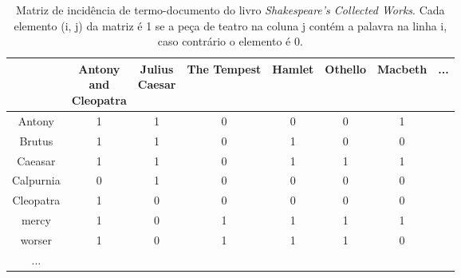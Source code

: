 \begin{table}[H]
    \centering
    \caption{Matriz de incidência de termo-documento do livro \textit{Shakespeare’s Collected Works}. Cada elemento (i, j) da matriz é 1 se a peça de teatro na coluna j contém a palavra na linha i, caso contrário o elemento é 0.}
    \begin{adjustbox}{max width={\textwidth},keepaspectratio}%
    \begin{tabular}{|c|c|c|c|c|c|c|c}
        \hline
        \diagbox{Palavra}{
            \raisebox{-1.27cm}{
                \rotatebox{90}{
                    \parbox{1.6cm}{\centering Peça \\ de teatro}
                }
            }
        } 
        & \makecell{Antony \\ and \\ Cleopatra} 
        & \makecell{Julius \\ Caesar} 
        & The Tempest 
        & Hamlet 
        & Othello 
        & Macbeth 
        & ... 
        \\ \hline
        Antony     & 1 & 1 & 0 & 0 & 0 & 1 & \\
        Brutus     & 1 & 1 & 0 & 1 & 0 & 0 & \\
        Caeasar    & 1 & 1 & 0 & 1 & 1 & 1 & \\
        Calpurnia  & 0 & 1 & 0 & 0 & 0 & 0 & \\
        Cleopatra  & 1 & 0 & 0 & 0 & 0 & 0 & \\
        mercy      & 1 & 0 & 1 & 1 & 1 & 1 & \\
        worser     & 1 & 0 & 1 & 1 & 1 & 0 & \\
        ...        & & & & & & & 
    \end{tabular}
    \end{adjustbox}
    \label{tab:matriz-incidência-termo-documento}
\end{table}